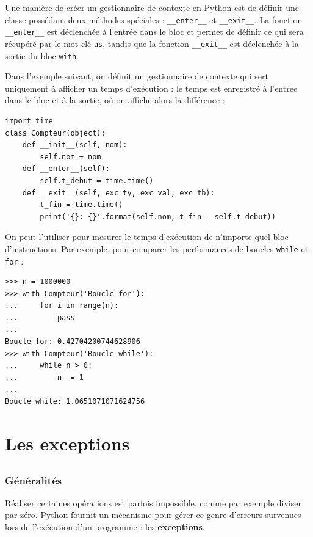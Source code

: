 \documentclass[12pt, a4paper]{article}
\begin{document}
Une manière de créer un gestionnaire de contexte en Python est de définir une classe possédant deux méthodes spéciales : \lstinline{__enter__} et \lstinline{__exit__}. La fonction \lstinline{__enter__} est déclenchée à l'entrée dans le bloc et permet de définir ce qui sera récupéré par le mot clé \lstinline{as}, tandis que la fonction \lstinline{__exit__} est déclenchée à la sortie du bloc \lstinline{with}.

Dans l'exemple suivant, on définit un gestionnaire de contexte qui sert uniquement à afficher un temps d'exécution : le temps est enregistré à l'entrée dans le bloc et à la sortie, où on affiche alors la différence :
\begin{lstlisting}
import time
class Compteur(object):
    def __init__(self, nom):
        self.nom = nom
    def __enter__(self):
        self.t_debut = time.time()
    def __exit__(self, exc_ty, exc_val, exc_tb):
        t_fin = time.time()
        print('{}: {}'.format(self.nom, t_fin - self.t_debut))
\end{lstlisting}

On peut l'utiliser pour mesurer le temps d'exécution de n'importe quel bloc d'instructions. Par exemple, pour comparer les performances de boucles \lstinline{while} et \lstinline{for} :
\begin{lstlisting}
>>> n = 1000000
>>> with Compteur('Boucle for'):
...     for i in range(n):
...         pass
...
Boucle for: 0.42704200744628906
>>> with Compteur('Boucle while'):
...     while n > 0:
...         n -= 1
...
Boucle while: 1.0651071071624756
\end{lstlisting}


\newpage
\part{Les exceptions}
\chapter{}

\section{Généralités}
Réaliser certaines opérations est parfois impossible, comme par exemple diviser par zéro. Python fournit un mécanisme pour gérer ce genre d'erreurs survenues lors de l'exécution d'un programme : les \textbf{exceptions}.
\end{document}
